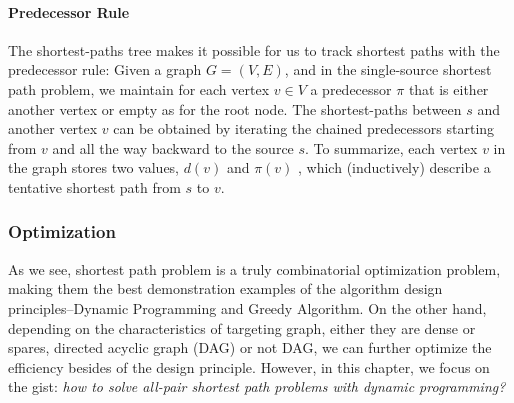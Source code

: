 \documentclass[../main.tex]{subfiles}
\begin{document}
\paragraph{Predecessor Rule}
The shortest-paths tree makes it possible for us to track shortest paths with the predecessor rule: Given a graph $G=(V,E)$, and in the single-source shortest path problem, we maintain for each vertex $v\in V$ a predecessor $\pi$ that is either another vertex or empty as for the root node. The shortest-paths between $s$ and another vertex $v$ can be obtained by iterating the chained predecessors starting from $v$ and all the way backward to the source $s$. To summarize, each vertex $v$ in the graph stores
two values, $d(v)$ and $\pi(v)$ , which (inductively) describe a tentative shortest path from $s$ to $v$.

\subsubsection{Optimization}
As we see, shortest path problem is a truly combinatorial optimization problem, making them the best demonstration examples of the algorithm design principles--Dynamic Programming and Greedy Algorithm. On the other hand, depending on the characteristics of targeting graph, either they are dense or spares, directed acyclic graph (DAG) or not DAG, we can further optimize the efficiency besides of the design principle. However, in this chapter, we focus on the gist: \textit{how to solve all-pair shortest path problems with dynamic programming?}

\end{document}
